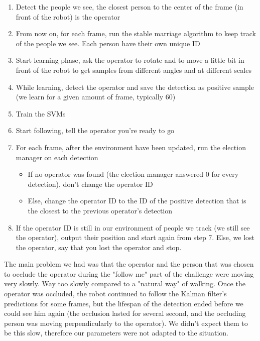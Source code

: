 \documentclass[a4paper, twocolumn]{article}
\begin{document}
    \begin{enumerate}
        \item Detect the people we see, the closest person to the center of the frame (in front of the robot) is the operator
        \item From now on, for each frame, run the stable marriage algorithm to keep track of the people we see. Each person have their own unique ID
        \item Start learning phase, ask the operator to rotate and to move a little bit in front of the robot to get samples from different angles and at different scales
        \item While learning, detect the operator and save the detection as positive sample (we learn for a given amount of frame, typically 60)
        \item Train the SVMs
        \item Start following, tell the operator you're ready to go
        \item For each frame, after the environment have been updated, run the election manager on each detection
        \begin{itemize}
            \item If no operator was found (the election manager answered 0 for every detection), don't change the operator ID
            \item Else, change the operator ID to the ID of the positive detection that is the closest to the previous operator's detection
        \end{itemize}
        \item If the operator ID is still in our environment of people we track (we still see the operator), output their position and start again from step 7. Else, we lost the operator, say that you lost the operator and stop.
    \end{enumerate}
    
    The main problem we had was that the operator and the person that was chosen to occlude the operator during the "follow me" part of the challenge were moving very slowly. Way too slowly compared to a "natural way" of walking. Once the operator was occluded, the robot continued to follow the Kalman filter's predictions for some frames, but the lifespan of the detection ended before we could see him again (the occlusion lasted for several second, and the occluding person was moving perpendicularly to the operator). We didn't expect them to be this slow, therefore our parameters were not adapted to the situation.
    
\end{document}
